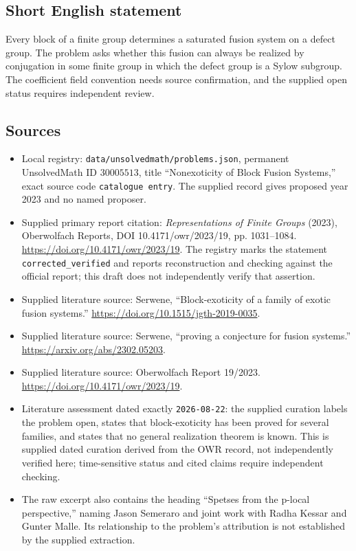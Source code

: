 \documentclass[11pt]{article}
\begin{document}
\subsection{Short English statement}
Every block of a finite group determines a saturated fusion system on a defect group. The problem asks whether this fusion can always be realized by conjugation in some finite group in which the defect group is a Sylow subgroup. The coefficient field convention needs source confirmation, and the supplied open status requires independent review.
\subsection{Sources}
\begin{itemize}
\item Local registry: \texttt{data/unsolvedmath/problems.json}, permanent UnsolvedMath ID \(30005513\), title ``Nonexoticity of Block Fusion Systems,'' exact source code \texttt{catalogue entry}. The supplied record gives proposed year 2023 and no named proposer.
\item Supplied primary report citation: \emph{Representations of Finite Groups} (2023), Oberwolfach Reports, DOI 10.4171/owr/2023/19, pp. 1031--1084. \url{https://doi.org/10.4171/owr/2023/19}. The registry marks the statement \texttt{corrected\_verified} and reports reconstruction and checking against the official report; this draft does not independently verify that assertion.
\item Supplied literature source: Serwene, ``Block-exoticity of a family of exotic fusion systems.'' \url{https://doi.org/10.1515/jgth-2019-0035}.
\item Supplied literature source: Serwene, ``proving a conjecture for fusion systems.'' \url{https://arxiv.org/abs/2302.05203}.
\item Supplied literature source: Oberwolfach Report 19/2023. \url{https://doi.org/10.4171/owr/2023/19}.
\item Literature assessment dated exactly \texttt{2026-08-22}: the supplied curation labels the problem open, states that block-exoticity has been proved for several families, and states that no general realization theorem is known. This is supplied dated curation derived from the OWR record, not independently verified here; time-sensitive status and cited claims require independent checking.
\item The raw excerpt also contains the heading ``Spetses from the p-local perspective,'' naming Jason Semeraro and joint work with Radha Kessar and Gunter Malle. Its relationship to the problem's attribution is not established by the supplied extraction.
\end{itemize}
\end{document}
